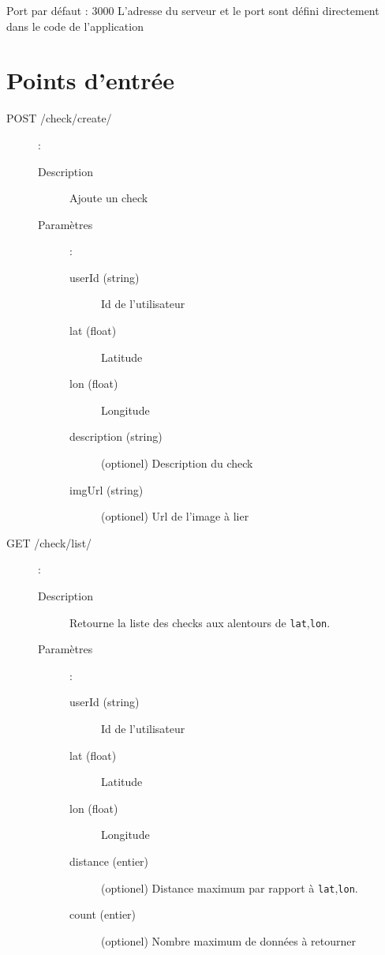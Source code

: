 \documentclass[a4paper,12pt]{report}
\begin{document}
\begin{onehalfspace}
Port par défaut : 3000\newline
L'adresse du serveur et le port sont défini directement dans le code de l'application

\section*{Points d'entrée}
\begin{description}
  \item[POST /check/create/]:

    \begin{description}
      \item[Description] Ajoute un check
      \item[Paramètres]:

        \begin{description}
          \item[userId (string)] Id de l'utilisateur
          \item[lat (float)] Latitude
          \item[lon (float)] Longitude
          \item[description (string)] (optionel) Description du check
          \item[imgUrl (string)] (optionel) Url de l'image à lier
        \end{description}
    \end{description}

  \item[GET /check/list/]:

    \begin{description}
      \item[Description] Retourne la liste des checks aux alentours de \lstinline{lat},\lstinline{lon}.

      \item[Paramètres]:
        \begin{description}
          \item[userId (string)] Id de l'utilisateur
          \item[lat (float)] Latitude
          \item[lon (float)] Longitude
          \item[distance (entier)] (optionel) Distance maximum par rapport à \lstinline{lat},\lstinline{lon}.
          \item[count (entier)] (optionel) Nombre maximum de données à retourner
        \end{description}
    \end{description}


\end{description}
\end{onehalfspace}
\end{document}
